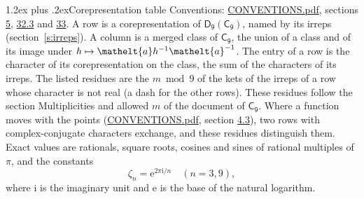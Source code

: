 \documentclass[10pt,a4paper]{article}
\makeatletter
\renewcommand\section{\@startsection{section}{1}{\z@}{-3ex plus -1ex minus -.2ex}%
  {1.2ex plus .2ex}{\normalfont\large\sffamily\bfseries\color{parttitle}}}
\numberwithin{equation}{section}
\newcommand{\eltfont}[1]{{\let\sigma\eltsigma\mathelt{#1}}}
\newcommand{\grp}[1]{\mathsf{#1}}
\newcommand{\elt}[1]{\eltfont{#1}}
\newcommand{\iunit}{\mathrm{i}}
\newcommand{\expe}{\mathrm{e}}
\newcommand{\rootunity}[1]{\zeta_{#1}}
\makeatother
\begin{document}
\section{Corepresentation table}\label{s:character_table}
Conventions: \href{../../CONVENTIONS.pdf}{CONVENTIONS.pdf}, sections \href{../../../rotation/CONVENTIONS.pdf\#conv.5}{5}, \href{../../CONVENTIONS.pdf\#conv.32.3}{32.3} and \href{../../CONVENTIONS.pdf\#conv.33}{33}.
A row is a corepresentation of $\grp{D_{9}}(\grp{C_{9}})$, named by its irreps (section~\ref{s:irreps}). A column is a merged class of $\grp{C_{9}}$, the union of a class and of its image under $h \mapsto \elt{a} h^{-1} \elt{a}^{-1}$. The entry of a row is the character of its corepresentation on the class, the sum of the characters of its irreps.
\leavevmode\label{n:head.parity}The listed residues are the $m \bmod 9$ of the kets of the irreps of a row whose character is not real (a dash for the other rows). These residues follow the section Multiplicities and allowed $m$ of the document of \href{../../../rotation/data/pdf/C9.pdf}{$\grp{C_{9}}$}. Where a function moves with the points (\href{../../CONVENTIONS.pdf}{CONVENTIONS.pdf}, section \href{../../../rotation/CONVENTIONS.pdf\#conv.4.3}{4.3}), two rows with complex-conjugate characters exchange, and these residues distinguish them.
\leavevmode\label{n:constant.root}\label{n:index.root.order}Exact values are rationals, square roots, cosines and sines of rational multiples of $\pi$, and the constants
\begin{equation}\label{e:constants}\rootunity{n} = \expe^{2\pi\iunit/n}\quad(n = 3, 9),\end{equation}
where $\iunit$ is the imaginary unit and $\expe$ is the base of the natural logarithm.
\end{document}
